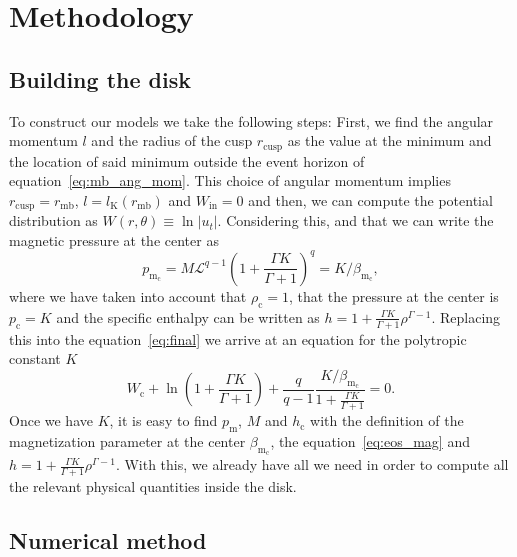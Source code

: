 \documentclass[twocolumn,aps,showpacs,showkeys,prd,superscriptaddress,byrevtex, amsmath]{revtex4-1}
\begin{document}
\section{Methodology}
\label{procedure}

\subsection{Building the disk}

To construct our models we take the following steps:
First, we find the angular momentum $l$ and the radius of the cusp $r_{\mathrm{cusp}}$ as the value at the minimum and the location of said minimum outside the event horizon of equation~\eqref{eq:mb_ang_mom}. This choice of angular momentum implies $r_{\mathrm{cusp}} = r_{\mathrm{mb}}$, $l = l_{\mathrm{K}}(r_{\mathrm{mb}})$ and $W_{\mathrm{in}} = 0$ and then, we can compute the potential distribution as $W(r, \theta) \equiv \ln |u_t|$. Considering this, and that we can write the magnetic pressure at the center as
\begin{equation}
p_{\mathrm{m_c}} = M \mathcal{L}^{q-1} \left(1 + \frac{\Gamma K}{\Gamma +1}\right)^q = K/\beta_{\mathrm{m_c}},
\end{equation}
where we have taken into account that $\rho_{\mathrm{c}} = 1$, that the pressure at the center is $p_{\mathrm{c}} = K$ and the specific enthalpy can be written as $h = 1 + \frac{\Gamma K}{\Gamma +1}\rho^{\Gamma -1}$. Replacing this into the equation~\eqref{eq:final} we arrive at an equation for the polytropic constant $K$
\begin{equation}\label{eq:K_eq}
W_{\mathrm{c}} + \ln \left(1 + \frac{\Gamma K}{\Gamma +1}\right) + \frac{q}{q-1}\frac{K/\beta_{\mathrm{m_c}}}{1 + \frac{\Gamma K}{\Gamma +1}} = 0.
\end{equation}
Once we have $K$, it is easy to find $p_{\mathrm{m}}$, $M$ and $h_{\mathrm{c}}$ with the definition of the magnetization parameter at the center $\beta_{\mathrm{m_c}}$, the equation~\eqref{eq:eos_mag} and $h = 1 + \frac{\Gamma K}{\Gamma +1}\rho^{\Gamma -1}$. With this, we already have all we need in order to compute all the relevant physical quantities inside the disk.

\subsection{Numerical method}
\end{document}
